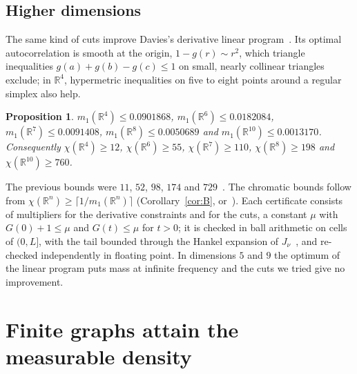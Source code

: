 \documentclass[11pt]{amsart}
\newtheorem{proposition}[theorem]{Proposition}
\theoremstyle{definition}
\newcommand{\R}{\mathbb{R}}
\begin{document}
\subsection*{Higher dimensions}
The same kind of cuts improve Davies's derivative linear program~\cite[Lemma 9.2 and Table 1]{Davies}. Its optimal autocorrelation is smooth at the origin, $1-g(r)\sim r^2$, which triangle inequalities $g(a)+g(b)-g(c)\le1$ on small, nearly collinear triangles exclude; in $\R^4$, hypermetric inequalities on five to eight points around a regular simplex also help.

\begin{proposition}\label{prop:highdim}
$m_1(\R^4)\le0.0901868$, $m_1(\R^6)\le0.0182084$, $m_1(\R^7)\le0.0091408$, $m_1(\R^8)\le0.0050689$ and $m_1(\R^{10})\le0.0013170$. Consequently $\chi(\R^4)\ge12$, $\chi(\R^6)\ge55$, $\chi(\R^7)\ge110$, $\chi(\R^8)\ge198$ and $\chi(\R^{10})\ge760$.
\end{proposition}

The previous bounds were $11$, $52$, $98$, $174$ and $729$~\cite{DOV,Davies}. The chromatic bounds follow from $\chi(\R^n)\ge\lceil1/m_1(\R^n)\rceil$ (Corollary~\ref{cor:B}, or~\cite[Theorem 1.1]{Davies}). Each certificate consists of multipliers for the derivative constraints and for the cuts, a constant $\mu$ with $G(0)+1\le\mu$ and $G(t)\le\mu$ for $t>0$; it is checked in ball arithmetic on cells of $(0,L]$, with the tail bounded through the Hankel expansion of $J_\nu$~\cite[\S10.17(iii)]{DLMF}, and re-checked independently in floating point. In dimensions $5$ and $9$ the optimum of the linear program puts mass at infinite frequency and the cuts we tried give no improvement.

\section{Finite graphs attain the measurable density}\label{sec:finite}
\end{document}
